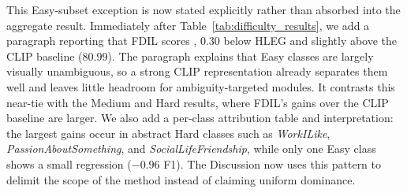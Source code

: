 {This Easy-subset exception is now stated explicitly rather than absorbed into the aggregate result. Immediately after Table~\ref{tab:difficulty_results}, we add a paragraph reporting that FDIL scores , $0.30$ below HLEG and slightly above the CLIP baseline ($80.99$). The paragraph explains that Easy classes are largely visually unambiguous, so a strong CLIP representation already separates them well and leaves little headroom for ambiguity-targeted modules. It contrasts this near-tie with the Medium and Hard results, where FDIL's gains over the CLIP baseline are larger. We also add a per-class attribution table and interpretation: the largest gains occur in abstract Hard classes such as \textit{WorkILike}, \textit{PassionAboutSomething}, and \textit{SocialLifeFriendship}, while only one Easy class shows a small regression ($-0.96$ F1). The Discussion now uses this pattern to delimit the scope of the method instead of claiming uniform dominance.
}
\showDifficultyResults
\showPerClassAttr
